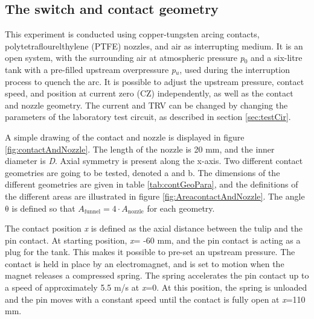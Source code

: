 \documentclass[10pt,a4paper,twoside]{article}
\begin{document}
\subsection{The switch and contact geometry}
This experiment is conducted using copper-tungsten arcing contacts, polytetraflourelthylene (PTFE) nozzles, and air as interrupting medium. It is an open system, with the surrounding air at atmospheric pressure \textit{p$_0$} and a six-litre tank with a pre-filled upstream overpressure \textit{p$_u$}, used during the interruption process to quench the arc. It is possible to adjust the upstream pressure, contact speed, and position at current zero (CZ) independently, as well as the contact and nozzle geometry. The current and TRV can be changed by changing the parameters of the laboratory test circuit, as described in section \ref{sec:testCir}.


A simple drawing of the contact and nozzle is displayed in figure \ref{fig:contactAndNozzle}. The length of the nozzle is 20 mm, and the inner diameter is \textit{D}. Axial symmetry is present along the x-axis. Two different contact geometries are going to be tested, denoted a and b. The dimensions of the different geometries are given in table \ref{tab:contGeoPara}, and the definitions of the different areas are illustrated in figure \ref{fig:AreacontactAndNozzle}. The angle $\mathrm{\theta}$ is defined so that $A_\mathrm{{funnel}}=4 \cdot A_\mathrm{{nozzle}}$ for each geometry.

The contact position \textit{x} is defined as the axial distance between the tulip and the pin contact. At starting position, \textit{x}= -60 mm, and the pin contact is acting as a plug for the tank. This makes it possible to pre-set an upstream pressure. The contact is held in place by an electromagnet, and is set to motion when the magnet releases a compressed spring. The spring accelerates the pin contact up to a speed of approximately 5.5 m/s at \textit{x}=0. At this position, the spring is unloaded and the pin moves with a constant speed until the contact is fully open at \textit{x}=110 mm.
\end{document}
